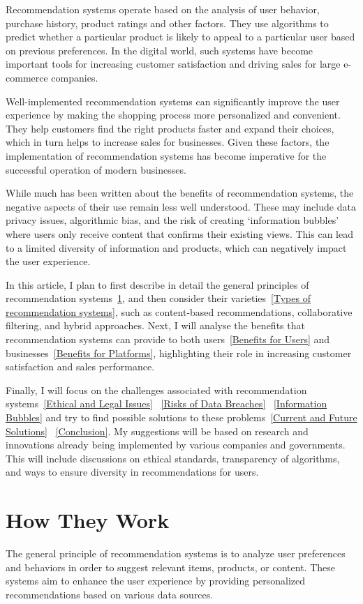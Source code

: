 \documentclass[10pt,twoside,slovak,a4paper]{article}
\begin{document}
Recommendation systems operate based on the analysis of user behavior, purchase history, product ratings and other factors. They use algorithms to predict whether a particular product is likely to appeal to a particular user based on previous preferences. In the digital world, such systems have become important tools for increasing customer satisfaction and driving sales for large e-commerce companies.

Well-implemented recommendation systems can significantly improve the user experience by making the shopping process more personalized and convenient. They help customers find the right products faster and expand their choices, which in turn helps to increase sales for businesses. Given these factors, the implementation of recommendation systems has become imperative for the successful operation of modern businesses.


While much has been written about the benefits of recommendation systems, the negative aspects of their use remain less well understood. These may include data privacy issues, algorithmic bias, and the risk of creating ‘information bubbles’ where users only receive content that confirms their existing views. This can lead to a limited diversity of information and products, which can negatively impact the user experience.

In this article, I plan to first describe in detail the general principles of recommendation systems~\ref{How They Work}, and then consider their varieties~\ref{Types of recommendation systems}, such as content-based recommendations, collaborative filtering, and hybrid approaches. Next, I will analyse the benefits that recommendation systems can provide to both users~\ref{Benefits for Users} and businesses~\ref{Benefits for Platforms}, highlighting their role in increasing customer satisfaction and sales performance.

Finally, I will focus on the challenges associated with recommendation systems~\ref{Ethical and Legal Issues} ~\ref{Risks of Data Breaches} ~\ref{Information Bubbles} and try to find possible solutions to these problems~\ref{Current and Future Solutions} ~\ref{Conclusion}. My suggestions will be based on research and innovations already being implemented by various companies and governments. This will include discussions on ethical standards, transparency of algorithms, and ways to ensure diversity in recommendations for users.




\section{How They Work} \label{How They Work}
The general principle of recommendation systems is to analyze user preferences and behaviors in order to suggest relevant items, products, or content. These systems aim to enhance the user experience by providing personalized recommendations based on various data sources.
\end{document}
